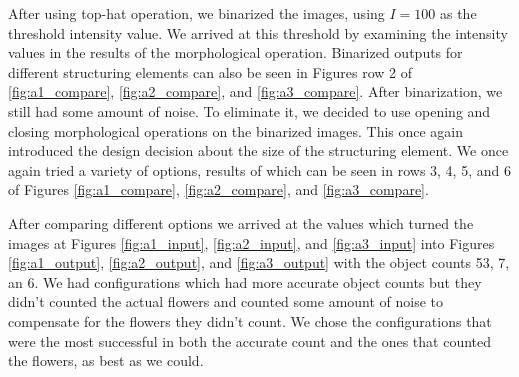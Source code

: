 \documentclass[conference]{IEEEtran}
\begin{document}
    After using top-hat operation, we binarized the images, using $I = 100$ as the threshold intensity value. We arrived at this threshold by examining the intensity values in the results of the morphological operation. Binarized outputs for different structuring elements can also be seen in Figures row 2 of \ref{fig:a1_compare}, \ref{fig:a2_compare}, and \ref{fig:a3_compare}. After binarization, we still had some amount of noise. To eliminate it, we decided to use opening and closing morphological operations on the binarized images. This once again introduced the design decision about the size of the structuring element. We once again tried a variety of options, results of which can be seen in rows 3, 4, 5, and 6 of Figures \ref{fig:a1_compare}, \ref{fig:a2_compare}, and \ref{fig:a3_compare}.

    After comparing different options we arrived at the values which turned the images at Figures \ref{fig:a1_input}, \ref{fig:a2_input}, and \ref{fig:a3_input} into Figures \ref{fig:a1_output}, \ref{fig:a2_output}, and \ref{fig:a3_output} with the object counts 53, 7, an 6. We had configurations which had more accurate object counts but they didn't counted the actual flowers and counted some amount of noise to compensate for the flowers they didn't count. We chose the configurations that were the most successful in both the accurate count and the ones that counted the flowers, as best as we could.
\end{document}
